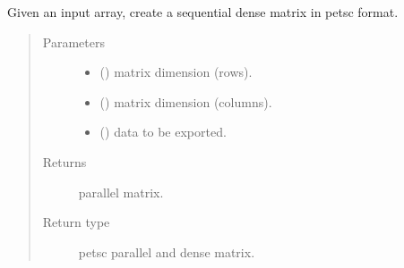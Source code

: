 \documentclass[letterpaper,10pt,english]{sphinxmanual}
\begin{document}
\begin{fulllineitems}
\label{\detokenize{petgem/parallel:petgem.parallel.createSequentialDenseMatrixWithArray}}
Given an input array, create a sequential dense matrix in petsc format.
\begin{quote}\begin{description}
\item[{Parameters}] \leavevmode\begin{itemize}
\item {} 
 () \textendash{} matrix dimension (rows).

\item {} 
 () \textendash{} matrix dimension (columns).

\item {} 
 () \textendash{} data to be exported.

\end{itemize}

\item[{Returns}] \leavevmode
parallel matrix.

\item[{Return type}] \leavevmode
petsc parallel and dense matrix.

\end{description}\end{quote}

\end{fulllineitems}

\end{document}
